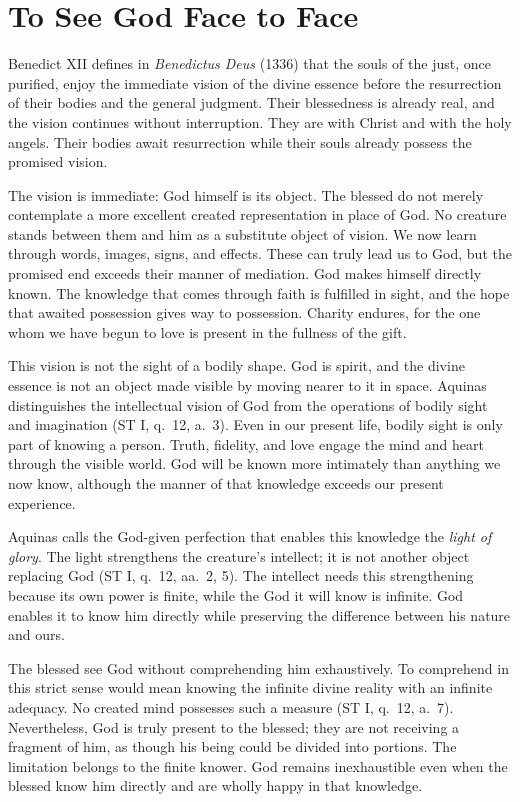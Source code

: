 \section{To See God Face to Face}

Benedict XII defines in \emph{Benedictus Deus} (1336) that the souls of the just, once purified, enjoy the immediate vision of the divine essence before the resurrection of their bodies and the general judgment. Their blessedness is already real, and the vision continues without interruption. They are with Christ and with the holy angels. Their bodies await resurrection while their souls already possess the promised vision.

The vision is immediate: God himself is its object. The blessed do not merely contemplate a more excellent created representation in place of God. No creature stands between them and him as a substitute object of vision. We now learn through words, images, signs, and effects. These can truly lead us to God, but the promised end exceeds their manner of mediation. God makes himself directly known. The knowledge that comes through faith is fulfilled in sight, and the hope that awaited possession gives way to possession. Charity endures, for the one whom we have begun to love is present in the fullness of the gift.

This vision is not the sight of a bodily shape. God is spirit, and the divine essence is not an object made visible by moving nearer to it in space. Aquinas distinguishes the intellectual vision of God from the operations of bodily sight and imagination (ST I, q.~12, a.~3). Even in our present life, bodily sight is only part of knowing a person. Truth, fidelity, and love engage the mind and heart through the visible world. God will be known more intimately than anything we now know, although the manner of that knowledge exceeds our present experience.

Aquinas calls the God-given perfection that enables this knowledge the \emph{light of glory}. The light strengthens the creature's intellect; it is not another object replacing God (ST I, q.~12, aa.~2, 5). The intellect needs this strengthening because its own power is finite, while the God it will know is infinite. God enables it to know him directly while preserving the difference between his nature and ours.

The blessed see God without comprehending him exhaustively. To comprehend in this strict sense would mean knowing the infinite divine reality with an infinite adequacy. No created mind possesses such a measure (ST I, q.~12, a.~7). Nevertheless, God is truly present to the blessed; they are not receiving a fragment of him, as though his being could be divided into portions. The limitation belongs to the finite knower. God remains inexhaustible even when the blessed know him directly and are wholly happy in that knowledge.

